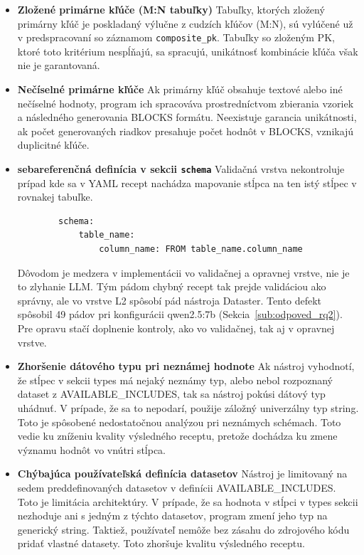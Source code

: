 \begin{itemize}
    \item \textbf{Zložené primárne kľúče (M:N tabuľky)}
    Tabuľky, ktorých zložený primárny kľúč je poskladaný výlučne z cudzích kľúčov (M:N), sú vylúčené už v predspracovaní so záznamom \texttt{composite\_pk}. Tabuľky so zloženým PK, ktoré toto kritérium nespĺňajú, sa spracujú, unikátnosť kombinácie kľúča však nie je garantovaná.
    
    \item \textbf{Nečíselné primárne kľúče}
    Ak primárny kľúč obsahuje textové alebo iné nečíselné hodnoty, program ich spracováva prostredníctvom zbierania vzoriek a následného generovania BLOCKS formátu. Neexistuje garancia unikátnosti, ak počet generovaných riadkov presahuje počet hodnôt v BLOCKS, vznikajú duplicitné kľúče.
    
    \item \textbf{sebareferenčná definícia v sekcii \texttt{schema} }
    Validačná vrstva nekontroluje prípad kde sa v YAML recept nachádza mapovanie stĺpca na ten istý stĺpec v rovnakej tabuľke. 

    \begin{lstlisting}
        schema:
            table_name:
                column_name: FROM table_name.column_name
    \end{lstlisting}
    
    Dôvodom je medzera v implementácii vo validačnej a opravnej vrstve, nie je to zlyhanie LLM. Tým pádom chybný recept tak prejde validáciou ako správny, ale vo vrstve L2 spôsobí pád nástroja Dataster. Tento defekt spôsobil 49 pádov pri konfigurácii qwen2.5:7b (Sekcia~\ref{sub:odpoved_rq2}). Pre opravu stačí doplnenie kontroly, ako vo validačnej, tak aj v opravnej vrstve.

    \item \textbf{Zhoršenie dátového typu pri neznámej hodnote}
    Ak nástroj vyhodnotí, že stĺpec v sekcii types má nejaký neznámy typ, alebo nebol rozpoznaný dataset z AVAILABLE\_INCLUDES, tak sa nástroj pokúsi dátový typ uhádnuť. V prípade, že sa to nepodarí, použije záložný univerzálny typ string. Toto je spôsobené nedostatočnou analýzou pri neznámych schémach. Toto vedie ku zníženiu kvality výsledného receptu, pretože dochádza ku zmene významu hodnôt vo vnútri stĺpca.

    \item \textbf{Chýbajúca používateľská definícia datasetov}
    Nástroj je limitovaný na sedem preddefinovaných datasetov v definícii AVAILABLE\_INCLUDES.  Toto je limitácia architektúry. V prípade, že sa hodnota v stĺpci v types sekcii nezhoduje ani s jedným z týchto datasetov, program zmení jeho typ na generický string. Taktiež, používateľ nemôže bez zásahu do zdrojového kódu pridať vlastné datasety. Toto zhoršuje kvalitu výsledného receptu.
    
\end{itemize}

